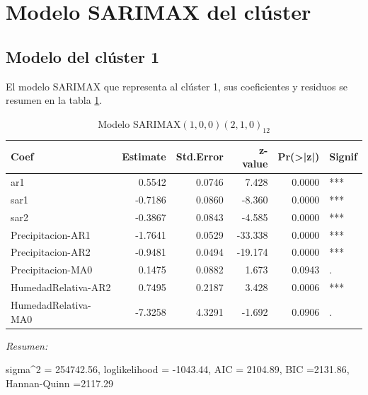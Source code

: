 \documentclass[12pt,oneside]{book}\usepackage[]{graphicx}\usepackage[]{color}
\newenvironment{knitrout}{}{} %
\theoremstyle{definition} %
\begin{document}
\section{Modelo SARIMAX del clúster}
\label{ap:sarimax}

\subsection{Modelo del clúster 1}

El modelo SARIMAX que representa al clúster 1, sus coeficientes y residuos se resumen en la tabla \ref{tab:sarimax_cl1}.

\begin{knitrout}
\color{fgcolor}\begin{table}

\caption{\label{tab:unnamed-chunk-95}\label{tab:sarimax_cl1}Modelo SARIMAX$(1,0,0)(2,1,0)_{12}$}
\centering
\begin{threeparttable}
\begin{tabular}[t]{lrrrrl}
\toprule
Coef & Estimate & Std.Error & z-value & Pr(>|z|) & Signif\\
\midrule
\rowcolor{gray!6}  ar1 & 0.5542 & 0.0746 & 7.428 & 0.0000 & ***\\
sar1 & -0.7186 & 0.0860 & -8.360 & 0.0000 & ***\\
\rowcolor{gray!6}  sar2 & -0.3867 & 0.0843 & -4.585 & 0.0000 & ***\\
Precipitacion-AR1 & -1.7641 & 0.0529 & -33.338 & 0.0000 & ***\\
\rowcolor{gray!6}  Precipitacion-AR2 & -0.9481 & 0.0494 & -19.174 & 0.0000 & ***\\
\addlinespace
Precipitacion-MA0 & 0.1475 & 0.0882 & 1.673 & 0.0943 & .\\
\rowcolor{gray!6}  HumedadRelativa-AR2 & 0.7495 & 0.2187 & 3.428 & 0.0006 & ***\\
HumedadRelativa-MA0 & -7.3258 & 4.3291 & -1.692 & 0.0906 & .\\
\bottomrule
\end{tabular}
\begin{tablenotes}
\item \textit{Resumen:} 
\item sigma\textasciicircum{}2 = 254742.56, loglikelihood = -1043.44, AIC = 2104.89, BIC =2131.86, Hannan-Quinn =2117.29
\end{tablenotes}
\end{threeparttable}
\end{table}


\end{knitrout}
\end{document}
